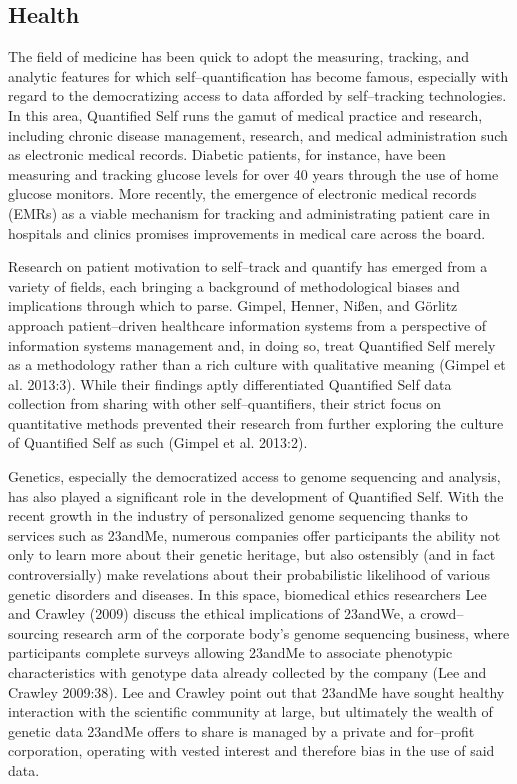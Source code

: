 \documentclass{article}
\begin{document}
\subsection*{Health}
The field of medicine has been quick to adopt the measuring,
tracking,
and analytic features for which self--quantification has become famous,
especially with regard to the democratizing access to data afforded by self--tracking technologies.
In this area,
Quantified Self runs the gamut of medical practice and research,
including chronic disease management,
research,
and medical administration such as electronic medical records.
Diabetic patients,
for instance,
have been measuring and tracking glucose levels for over 40 years through the use of home glucose monitors.
More recently,
the emergence of electronic medical records (EMRs) as a viable mechanism for tracking and administrating patient care in hospitals and clinics promises improvements in medical care across the board.

Research on patient motivation to self--track and quantify has emerged from a variety of fields,
each bringing a background of methodological biases and implications through which to parse.
Gimpel,
Henner,
Nißen,
and Görlitz approach patient--driven healthcare information systems from a perspective of information systems management and,
in doing so,
treat Quantified Self merely as a methodology rather than a rich culture with qualitative meaning (Gimpel et al.
2013:3).
While their findings aptly differentiated Quantified Self data collection from sharing with other self--quantifiers,
their strict focus on quantitative methods prevented their research from further exploring the culture of Quantified Self as such (Gimpel et al.
2013:2).

Genetics,
especially the democratized access to genome sequencing and analysis,
has also played a significant role in the development of Quantified Self.
With the recent growth in the industry of personalized genome sequencing thanks to services such as 23andMe,
numerous companies offer participants the ability not only to learn more about their genetic heritage,
but also ostensibly (and in fact controversially) make revelations about their probabilistic likelihood of various genetic disorders and diseases.
In this space,
biomedical ethics researchers Lee and Crawley (2009) discuss the ethical implications of 23andWe,
a crowd--sourcing research arm of the corporate body's genome sequencing business,
where participants complete surveys allowing 23andMe to associate phenotypic characteristics with genotype data already collected by the company
(Lee and Crawley 2009:38).
Lee and Crawley point out that 23andMe have sought healthy interaction with the scientific community at large,
but ultimately the wealth of genetic data 23andMe offers to share is managed by a private and for--profit corporation,
operating with vested interest and therefore bias in the use of said data.
\end{document}
